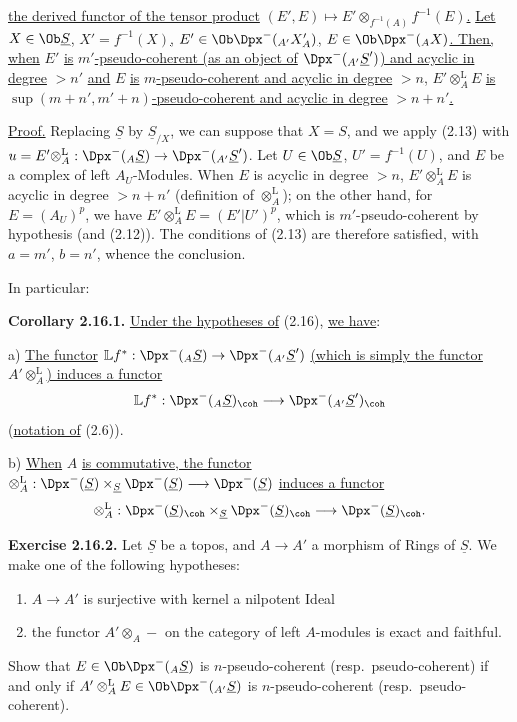 %
\uline{the derived functor of the tensor product} \((E',E)\longmapsto E'\otimes_{f^{-1}(A)} f^{-1}(E)\)\uline{.} \uline{Let} \(X\in\Ob \underline{S}\)\uline{,} \(X'=f^{-1}(X)\)\uline{,} \(E'\in\Ob\Dpx^-(_{A'}X'_A)\)\uline{,} \(E\in\Ob\Dpx^-(_A X)\)\uline{. Then, when} \(E'\) \uline{is} \(m'\)\uline{-pseudo-coherent (as an object of} \(\Dpx^-(_{A'}\underline{S}')\)\uline{) and acyclic in degree} \(>n'\) \uline{and} \(E\) \uline{is} \(m\)\uline{-pseudo-coherent and acyclic in degree} \(>n\)\uline{,} \(E'\otimes_A^{\mathrm L}E\) \uline{is} \(\sup(m+n',m'+n)\)\uline{-pseudo-coherent and acyclic in degree} \(>n+n'\)\uline{.}

\uline{Proof.} Replacing \(\underline{S}\) by \(\underline{S}_{/X}\), we can suppose that \(X=S\), and we apply (2.13) with \(u=E'\otimes_A^{\mathrm L}:\Dpx^-(_A \underline{S})\to\Dpx^-(_{A'}\underline{S}')\). Let \(U\in\Ob \underline{S}\), \(U'=f^{-1}(U)\), and \(E\) be a complex of left \(A_U\)-Modules. When \(E\) is acyclic in degree \(>n\), \(E'\otimes_A^{\mathrm L}E\) is acyclic in degree \(>n+n'\) (definition of \(\otimes_A^{\mathrm L}\)); on the other hand, for \(E=(A_U)^p\), we have \(E'\otimes_A^{\mathrm L}E=(E'|U')^p\), which is \(m'\)-pseudo-coherent by hypothesis (and (2.12)). The conditions of (2.13) are therefore satisfied, with \(a=m'\), \(b=n'\), whence the conclusion.

In particular:

\textbf{Corollary 2.16.1.} \uline{Under the hypotheses of} (2.16), \uline{we have}:

a) \uline{The functor} \(\mathbb{L}f^*: \Dpx^-(_A \underline{S})\to \Dpx^-(_{A'}\underline{S}')\) \uline{(which is simply the functor} \(A'\otimes_A^{\mathrm L}\)\uline{) induces a functor}
\[
  \mathbb{L}f^*: \Dpx^-(_A \underline{S})_{\coh}\longrightarrow \Dpx^-(_{A'}\underline{S}')_{\coh}
\]
(\uline{notation of} (2.6)).

b) \uline{When} \(A\) \uline{is commutative, the functor} \(\otimes_A^{\mathrm L}:\Dpx^-(\underline{S})\times_{\underline{S}}\Dpx^-(\underline{S})\longrightarrow \Dpx^-(\underline{S})\) \uline{induces a functor}
\[
  \otimes_A^{\mathrm L}:\Dpx^-(\underline{S})_{\coh}\times_{\underline{S}}\Dpx^-(\underline{S})_{\coh}
  \longrightarrow \Dpx^-(\underline{S})_{\coh} .
\]

%
\textbf{Exercise 2.16.2.} Let \(\underline{S}\) be a topos, and \(A\to A'\) a morphism of Rings of \(\underline{S}\). We make one of the following hypotheses:
\begin{enumerate}[label=(\roman*)]
\item \(A\to A'\) is surjective with kernel a nilpotent Ideal
\item the functor \(A'\otimes_A-\) on the category of left \(A\)-modules is exact and faithful.
\end{enumerate}
Show that \(E\in\Ob\Dpx^-(_A \underline{S})\) is \(n\)-pseudo-coherent (resp.\ pseudo-coherent) if and only if \(A'\otimes_A^{\mathrm L} E\in\Ob\Dpx^-(_{A'}\underline{S})\) is \(n\)-pseudo-coherent (resp.\ pseudo-coherent).

